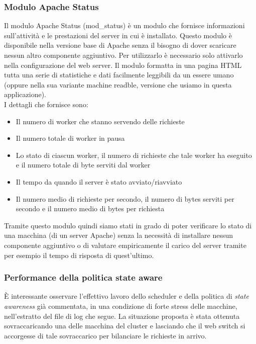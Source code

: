 \documentclass[italian]{tktltiki2}
\begin{document}
\subsubsection{Modulo Apache Status}
\label{sssec:apachestatus}
Il modulo Apache Status (mod\_status)\cite{mod_status} è un modulo che fornisce informazioni sull'attività e le prestazioni del server in cui è installato. Questo modulo è disponibile nella versione base di Apache senza il bisogno di dover scaricare nessun altro componente aggiuntivo. Per utilizzarlo è necessario solo attivarlo nella configurazione del web server. Il modulo formatta in una pagina HTML tutta una serie di statistiche e dati facilmente leggibili da un essere umano (oppure nella sua variante machine readble, versione che usiamo in questa applicazione).
\\
I dettagli che fornisce sono:

\begin{itemize}
  \item Il numero di worker che stanno servendo delle richieste
  \item Il numero totale di worker in pausa
  \item Lo stato di ciascun worker, il numero di richieste che tale worker ha eseguito e il numero totale di byte serviti dal worker
  \item Il tempo da quando il server è stato avviato/riavviato
  \item Il numero medio di richieste per secondo, il numero di bytes serviti per secondo e il numero medio di bytes per richiesta
\end{itemize}

Tramite questo modulo quindi siamo stati in grado di poter verificare lo stato di una macchina (di un server Apache) senza la necessità di installare nessun componente aggiuntivo o di valutare empiricamente il carico del server tramite per esempio il tempo di risposta di quest'ultimo.

\subsubsection{Performance della politica state aware}
È interessante osservare l'effettivo lavoro dello scheduler e della politica di \emph{state awareness} già commentata, in una condizione di forte stress delle macchine, nell'estratto del file di log che segue. La situazione proposta è stata ottenuta sovraccaricando una delle macchina del cluster e lasciando che il web switch si accorgesse di tale sovraccarico per bilanciare le richieste in arrivo.
\end{document}
